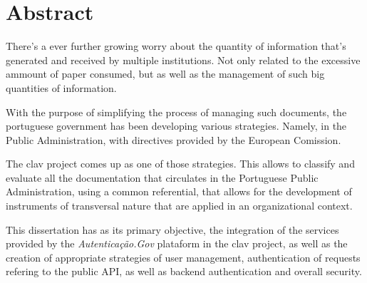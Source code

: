 \chapter*{Abstract}

There's a ever further growing worry about the quantity of information that's generated and received by multiple institutions. Not only related to the excessive ammount of paper consumed, but as well as the management of such big quantities of information.

With the purpose of simplifying the process of managing such documents, the portuguese government has been developing various strategies. Namely, in the Public Administration, with directives provided by the European Comission.

The \gls{clav} project comes up as one of those strategies. This allows to classify and evaluate all the documentation that circulates in the Portuguese Public Administration, using a common referential, that allows for the development of instruments of transversal nature that are applied in an organizational context.

This dissertation has as its primary objective, the integration of the services provided by the \emph{Autenticação.Gov} plataform in the \gls{clav} project, as well as the creation of appropriate strategies of user management, authentication of requests refering to the public API, as well as  backend authentication and overall security.

\vspace{5cm}
